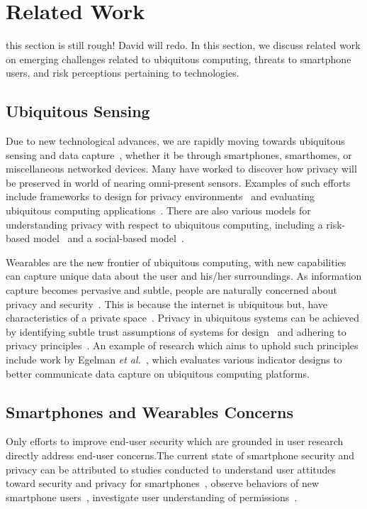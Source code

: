 \documentclass{acm_proc_article-sp}
\def\etal{{\it et al.~}}
\begin{document}
\section{Related Work}
{\color{red} this section is still rough! David will redo.} In this section, we discuss related work on emerging challenges related to ubiquitous computing, threats to smartphone users, and risk perceptions pertaining to technologies.

\subsection{Ubiquitous Sensing}
Due to new technological advances, we are rapidly moving towards ubiquitous sensing and data capture~\cite{abowd2000charting}, whether it be through smartphones, smarthomes, or miscellaneous networked devices. Many have worked to discover how privacy will be preserved in world of nearing omni-present sensors. Examples of such efforts include frameworks to design for privacy environments~\cite{bellotti1993design} and evaluating ubiquitous computing applications~\cite{scholtz2004toward}. There are also various models for understanding privacy with respect to ubiquitous computing, including a risk-based model~\cite{hong2004privacy} and a social-based model~\cite{jiang2002approximate}. 

Wearables are the new frontier of ubiquitous computing, with new capabilities can capture unique data about the user and his/her surroundings. As information capture becomes pervasive and subtle, people are naturally concerned about privacy and security~\cite{palen2003unpacking}. This is because the internet is ubiquitous but, have characteristics of a private space~\cite{camp2000internet}. Privacy in ubiquitous systems can be achieved by  identifying subtle trust assumptions of systems for design~\cite{camp2003designing} and adhering to privacy principles~\cite{langheinrich2001privacy}. An example of research which aims to uphold such principles include work by Egelman \etal , which evaluates various indicator designs to better communicate data capture on ubiquitous computing platforms. 

\subsection{Smartphones and Wearables Concerns}
Only efforts to improve end-user security which are grounded in user research directly address end-user concerns.The current state of smartphone security and privacy can be attributed to studies conducted to understand user attitudes toward security and privacy for smartphones~\cite{chin2012measuring}, observe behaviors of new smartphone users~\cite{palen2000going}, investigate user understanding of permissions~\cite{felt2012android}. 
\end{document}
